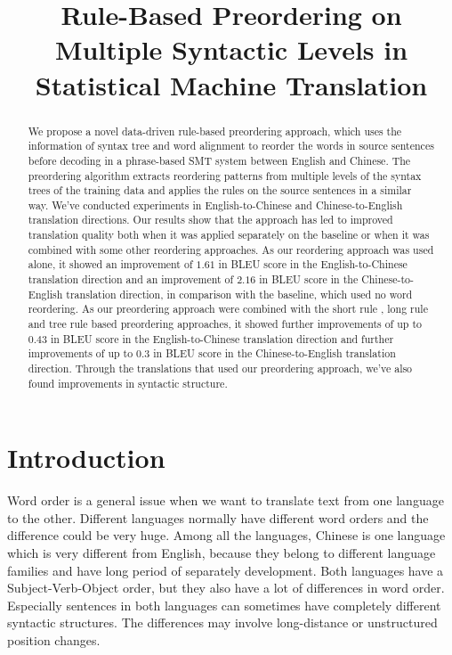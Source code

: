 \documentclass[a4paper]{article}
\title{Rule-Based Preordering on
Multiple Syntactic Levels in
Statistical Machine Translation}
\begin{document}
\maketitle
%
\begin{abstract}
We propose a novel data-driven rule-based preordering approach, which uses the information of syntax tree and word alignment to reorder the words in source sentences before decoding in a phrase-based SMT system between English and Chinese. The preordering algorithm extracts reordering patterns from multiple levels of the syntax trees of the training data and applies the rules on the source sentences in a similar way. We've conducted experiments in English-to-Chinese and Chinese-to-English translation directions. Our results show that the approach has led to improved translation quality both when it was applied separately on the baseline or when it was combined with some other reordering approaches. As our reordering approach was used alone, it showed an improvement of $1.61$ in BLEU score in the English-to-Chinese translation direction and an improvement of $2.16$ in BLEU score in the Chinese-to-English translation direction, in comparison with the baseline, which used no word reordering. As our preordering approach were combined with the short rule \cite{short}, long rule \cite{long} and tree rule \cite{tree} based preordering approaches, it showed further improvements of up to $0.43$ in BLEU score in the English-to-Chinese translation direction and further improvements of up to $0.3$ in BLEU score in the Chinese-to-English translation direction. Through the translations that used our preordering approach, we've also found improvements in syntactic structure.
\end{abstract}
%
\section{Introduction}

Word order is a general issue when we want to translate text from one language to the other. Different languages normally have different word orders and the difference could be very huge. Among all the languages, Chinese is one language which is very different from English, because they belong to different language families and have long period of separately development. Both languages have a Subject-Verb-Object order, but they also have a lot of differences in word order. Especially sentences in both languages can sometimes have completely different syntactic structures. The differences may involve long-distance or unstructured position changes.
\end{document}
